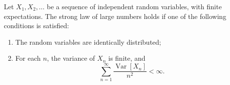 \documentclass[12pt]{article}
\begin{document}
Let $X_1,X_2,\dots$ be a sequence of independent random variables, with finite expectations. The strong law of large numbers holds if one of the following conditions is satisfied:

\begin{enumerate} 
\item The random variables are identically distributed;
\item For each $n$, the variance of $X_n$ is finite, and 
\[\sum_{n=1}^\infty \frac{\operatorname{Var}[X_n]}{n^2} <\infty.\]
\end{enumerate}
\end{document}
